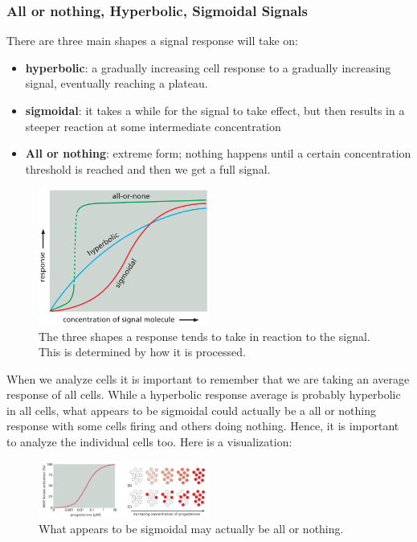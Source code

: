 \documentclass[../main.tex]{subfiles}
\begin{document}
\subsubsection{All or nothing, Hyperbolic, Sigmoidal Signals}

There are three main shapes a signal response will take on: 
\begin{itemize}
	\item \textbf{hyperbolic}: a gradually increasing cell response to a gradually increasing signal, eventually reaching a plateau.
	\item \textbf{sigmoidal}: it takes a while for the signal to take effect, but then results in a steeper reaction at some intermediate concentration
	\item \textbf{All or nothing}: extreme form; nothing happens until a certain concentration threshold is reached and then we get a full signal.
\end{itemize}
\begin{figure}[H]
	\centering
	\includegraphics[width=0.5\textwidth]{resp_types}
	\caption{The three shapes a response tends to take in reaction to the signal. This is determined by how it is processed.}
\end{figure} 

When we analyze cells it is important to remember that we are taking an average response of all cells. While a hyperbolic response average is probably hyperbolic in all cells, what appears to be sigmoidal could actually be a all or nothing response with some cells firing and others doing nothing. Hence, it is important to analyze the individual cells too. Here is a visualization:
\begin{figure}[H]
	\centering
	\includegraphics[width=0.5\textwidth]{resp_trick}
	\caption{What appears to be sigmoidal may actually be all or nothing.}
\end{figure} 
\end{document}
